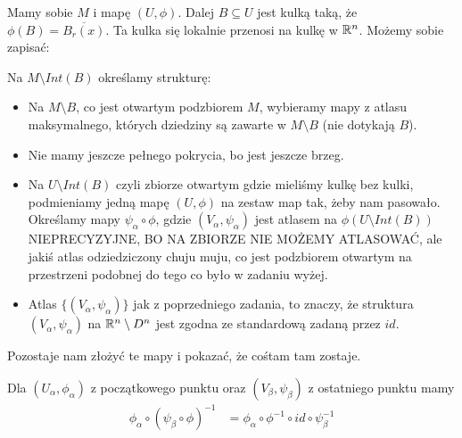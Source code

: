 Mamy sobie $M$ i mapę $(U, \phi)$. Dalej $B\subseteq U$ jest kulką taką, że
$\phi(B)=\overline{B_r(x)}$. Ta kulka się lokalnie przenosi na kulkę w $\mathbb{R}^n$. Możemy
sobie zapisać:

Na $M\setminus Int(B)$ określamy strukturę:
\begin{itemize}
    \item Na $M\setminus B$, co jest otwartym podzbiorem $M$, wybieramy mapy z atlasu
    maksymalnego, których dziedziny są zawarte w $M\setminus B$ (nie dotykają $B$).
    \item Nie mamy jeszcze pełnego pokrycia, bo jest jeszcze brzeg.
    \item Na $U\setminus Int(B)$ czyli zbiorze otwartym gdzie mieliśmy kulkę bez kulki,
    podmieniamy jedną mapę $(U,\phi)$ na zestaw map tak, żeby nam pasowało. Określamy mapy
    $\psi_\alpha\circ\phi$, gdzie $(V_\alpha,\psi_\alpha)$ jest atlasem na
    $\phi(U\setminus Int(B))${\color{red}NIEPRECYZYJNE, BO NA ZBIORZE NIE MOŻEMY
    ATLASOWAĆ, ale jakiś atlas odziedziczony chuju muju}, co jest podzbiorem otwartym na
    przestrzeni podobnej do tego co było w zadaniu wyżej.
    \item Atlas $\{(V_\alpha,\psi_\alpha)\}$ jak z poprzedniego zadania, to znaczy, że
    struktura $(V_\alpha,\psi_\alpha)$ na $\mathbb{R}^n\setminus D^n$ jest zgodna ze standardową
    zadaną przez $id$. 

\end{itemize}

Pozostaje nam złożyć te mapy i pokazać, że cośtam tam zostaje.

Dla $(U_\alpha,\phi_\alpha)$ z początkowego punktu oraz $(V_\beta,\psi_\beta)$ z
ostatniego punktu mamy
\begin{align*}
\phi_\alpha\circ(\psi_\beta\circ\phi)^{-1}&=\phi_\alpha\circ\phi^{-1}\circ id\circ\psi_\beta^{-1}
\end{align*}

